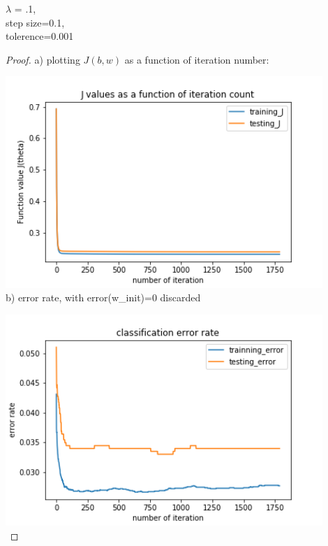\documentclass[12pt]{article}
\begin{document}
$\lambda$ = .1,\\ step size=0.1,\\ tolerence=0.001
\begin{proof}
a) plotting $J(b,w)$ as a function of iteration number:

\includegraphics[width = 12cm, height = 8cm]{../code/A6_b_1.png}\\

b) error rate, with error(w\_init)=0 discarded 

\includegraphics[width = 12cm, height = 8cm]{../code/A6_b_2.png}\\
\end{proof}

\newpage
\end{document}
